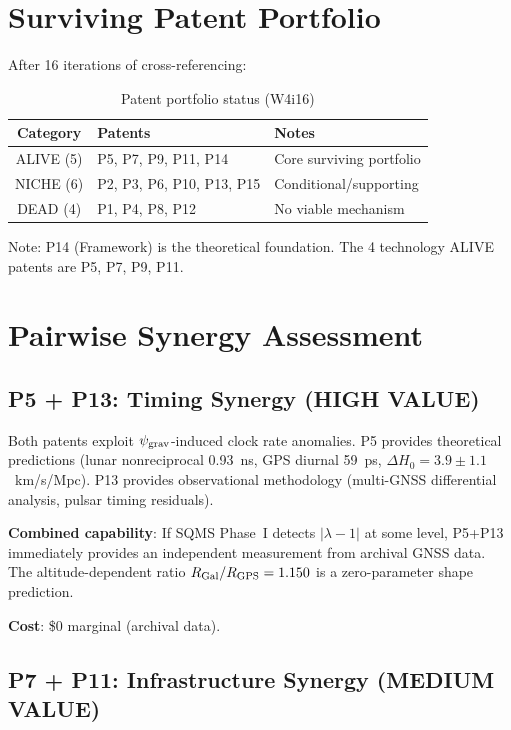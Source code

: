 \documentclass[11pt]{article}
\begin{document}
\section{Surviving Patent Portfolio}

After 16 iterations of cross-referencing:

\begin{table}[H]
\centering
\caption{Patent portfolio status (W4i16)}
\begin{tabular}{cll}
\toprule
Category & Patents & Notes \\
\midrule
ALIVE (5) & P5, P7, P9, P11, P14 & Core surviving portfolio \\
NICHE (6) & P2, P3, P6, P10, P13, P15 & Conditional/supporting \\
DEAD (4) & P1, P4, P8, P12 & No viable mechanism \\
\bottomrule
\end{tabular}
\end{table}

Note: P14 (Framework) is the theoretical foundation. The 4 technology
ALIVE patents are P5, P7, P9, P11.

\section{Pairwise Synergy Assessment}

\subsection{P5 + P13: Timing Synergy (HIGH VALUE)}

Both patents exploit $\psi_{\rm grav}$-induced clock rate anomalies.
P5 provides theoretical predictions (lunar nonreciprocal 0.93~ns,
GPS diurnal 59~ps, $\Delta H_0 = 3.9 \pm 1.1$~km/s/Mpc). P13 provides
observational methodology (multi-GNSS differential analysis, pulsar
timing residuals).

\textbf{Combined capability}: If SQMS Phase~I detects $|\lambda-1|$ at
some level, P5+P13 immediately provides an independent measurement
from archival GNSS data. The altitude-dependent ratio
$R_{\rm Gal}/R_{\rm GPS} = 1.150$ is a zero-parameter shape prediction.

\textbf{Cost}: \$0 marginal (archival data).

\subsection{P7 + P11: Infrastructure Synergy (MEDIUM VALUE)}
\end{document}
